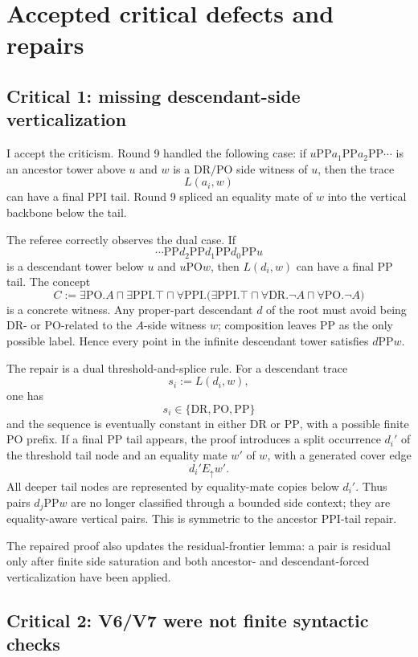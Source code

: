 \documentclass[11pt]{article}
\newcommand{\PP}{\mathrm{PP}}
\newcommand{\PPI}{\mathrm{PPI}}
\newcommand{\DR}{\mathrm{DR}}
\newcommand{\PO}{\mathrm{PO}}
\begin{document}
\section{Accepted critical defects and repairs}

\subsection{Critical 1: missing descendant-side verticalization}

I accept the criticism.  Round 9 handled the following case: if $u\PP a_1\PP a_2\PP\cdots$ is an ancestor tower above $u$ and $w$ is a $\DR/\PO$ side witness of $u$, then the trace
\[
   L(a_i,w)
\]
can have a final $\PPI$ tail.  Round 9 spliced an equality mate of $w$ into the vertical backbone below the tail.

The referee correctly observes the dual case.  If
\[
   \cdots\PP d_2\PP d_1\PP d_0\PP u
\]
is a descendant tower below $u$ and $u\PO w$, then $L(d_i,w)$ can have a final $\PP$ tail.  The concept
\[
C :=
\exists \PO.A
\sqcap
\exists \PPI.\top
\sqcap
\forall \PPI.
  \bigl(\exists \PPI.\top
    \sqcap \forall \DR.\neg A
    \sqcap \forall \PO.\neg A\bigr)
\]
is a concrete witness.  Any proper-part descendant $d$ of the root must avoid being $\DR$- or $\PO$-related to the $A$-side witness $w$; composition leaves $\PP$ as the only possible label.  Hence every point in the infinite descendant tower satisfies $d\PP w$.

The repair is a dual threshold-and-splice rule.  For a descendant trace
\[
   s_i := L(d_i,w),
\]
one has
\[
   s_i\in\{\DR,\PO,\PP\}
\]
and the sequence is eventually constant in either $\DR$ or $\PP$, with a possible finite $\PO$ prefix.  If a final $\PP$ tail appears, the proof introduces a split occurrence $d_i'$ of the threshold tail node and an equality mate $w'$ of $w$, with a generated cover edge
\[
   d_i' E_{\uparrow} w'.
\]
All deeper tail nodes are represented by equality-mate copies below $d_i'$.  Thus pairs $d_j\PP w$ are no longer classified through a bounded side context; they are equality-aware vertical pairs.  This is symmetric to the ancestor $\PPI$-tail repair.

The repaired proof also updates the residual-frontier lemma: a pair is residual only after finite side saturation and both ancestor- and descendant-forced verticalization have been applied.

\subsection{Critical 2: V6/V7 were not finite syntactic checks}
\end{document}
